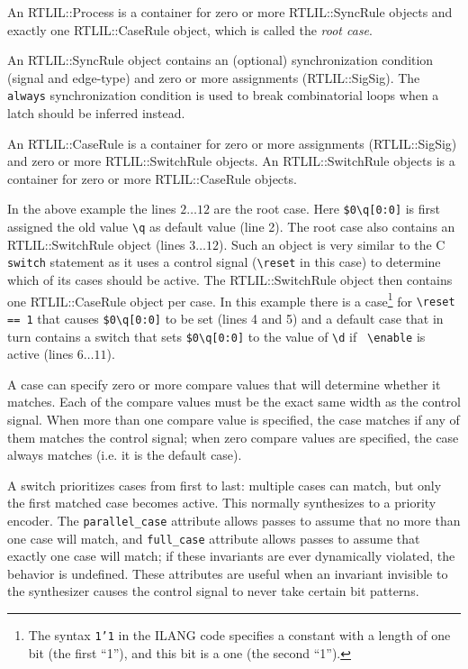 An RTLIL::Process is a container for zero or more RTLIL::SyncRule objects and
exactly one RTLIL::CaseRule object, which is called the {\it root case}.

An RTLIL::SyncRule object contains an (optional) synchronization condition (signal and edge-type) and zero or
more assignments (RTLIL::SigSig). The {\tt always} synchronization condition is used to break combinatorial
loops when a latch should be inferred instead.

An RTLIL::CaseRule is a container for zero or more assignments (RTLIL::SigSig)
and zero or more RTLIL::SwitchRule objects. An RTLIL::SwitchRule objects is a
container for zero or more RTLIL::CaseRule objects.

In the above example the lines $2 \dots 12$ are the root case. Here {\tt \$0\textbackslash{}q[0:0]} is first
assigned the old value {\tt \textbackslash{}q} as default value (line 2). The root case
also contains an RTLIL::SwitchRule object (lines $3 \dots 12$). Such an object is very similar to the C {\tt switch}
statement as it uses a control signal ({\tt \textbackslash{}reset} in this case) to determine
which of its cases should be active. The RTLIL::SwitchRule object then contains one RTLIL::CaseRule
object per case. In this example there is a case\footnote{The
syntax {\tt 1'1} in the ILANG code specifies a constant with a length of one bit (the first ``1''),
and this bit is a one (the second ``1'').} for {\tt \textbackslash{}reset == 1} that causes
{\tt \$0\textbackslash{}q[0:0]} to be set (lines 4 and 5) and a default case that in turn contains a switch that
sets {\tt \$0\textbackslash{}q[0:0]} to the value of {\tt \textbackslash{}d} if {\tt
\textbackslash{}enable} is active (lines $6 \dots 11$).

A case can specify zero or more compare values that will determine whether it matches. Each of the compare values
must be the exact same width as the control signal. When more than one compare value is specified, the case matches
if any of them matches the control signal; when zero compare values are specified, the case always matches (i.e.
it is the default case).

A switch prioritizes cases from first to last: multiple cases can match, but only the first matched case becomes
active. This normally synthesizes to a priority encoder. The {\tt parallel\_case} attribute allows passes to assume
that no more than one case will match, and {\tt full\_case} attribute allows passes to assume that exactly one
case will match; if these invariants are ever dynamically violated, the behavior is undefined. These attributes
are useful when an invariant invisible to the synthesizer causes the control signal to never take certain
bit patterns.

